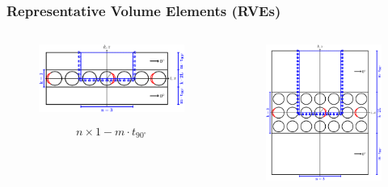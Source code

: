 \documentclass[first,firstsupp,lastsupp,last,hyperref,table]{ETHclass}
\begin{document}
\begin{frame}
\frametitle{\vspace{0.2cm}\small Representative Volume Elements (RVEs)}
\vspace{-1cm}
\centering
\begin{columns}[c]
\begin{column}{0.55\textwidth}
\centering
\begin{figure}
\centering
\includegraphics[width=\columnwidth]{thinPly.pdf}
\end{figure}
\vspace{-0.25cm}
\begin{equation*}
n\times 1-m\cdot t_{90^{\circ}}
\end{equation*}
\end{column}
\begin{column}{0.45\textwidth}
\centering
\begin{figure}
\centering
\includegraphics[width=\columnwidth]{ThickPly.pdf}

\end{figure}
\end{column}
\end{columns}
\end{frame}
\end{document}
